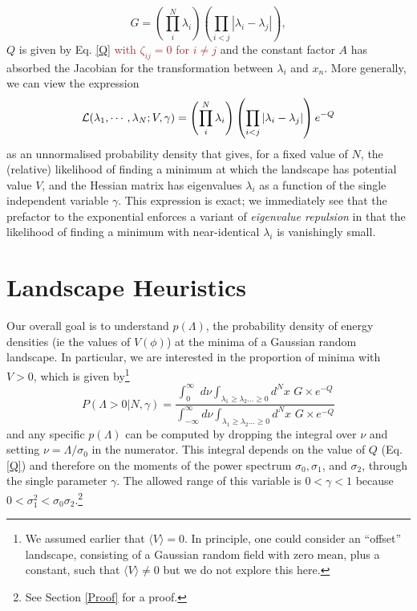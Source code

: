 \documentclass[12pt]{article}
\newcommand{\sh}[1]{\textcolor{brown}{#1}}
\begin{document}
\begin{equation}
G = \left(\prod_{i}^{N} \lambda_i \right)\left(\prod_{i<j} |\lambda_i-\lambda_j|\right),
\end{equation} 
%
$Q$ is given by Eq. \ref{Q} \sh{with $\zeta_{ij}=0$ for $i\neq j$} and the constant factor $A$ has absorbed the Jacobian for the transformation between $\lambda_i$ and $x_n$. More generally, we can view the expression
%
\begin{equation}
{\cal L}(\lambda_1,\cdots, \lambda_N; V, \gamma) = \left(\prod_{i}^{N} \lambda_i \right)\left(\prod_{i<j} |\lambda_i-\lambda_j|\right) e^{-Q}
\end{equation} 
%
as an unnormalised probability density that gives, for a fixed value of $N$, the (relative) likelihood of finding a minimum at which the landscape has potential value $V$, and the Hessian matrix has eigenvalues $\lambda_i$ as a function of the single independent variable $\gamma$. This expression is exact;  we immediately see that the prefactor to the exponential enforces a variant of {\em eigenvalue repulsion\/} \cite{Mehta1990}  in that the likelihood of finding a minimum with near-identical $\lambda_i$ is vanishingly small. 



\section{Landscape Heuristics}

Our  overall goal is to understand $p(\Lambda)$, the probability density of energy densities (ie the values of $V(\phi)$) at the minima of a Gaussian random landscape. In particular, we are interested in the proportion of  minima with $V > 0$, which is given by\footnote{We assumed earlier that $\langle V \rangle = 0$. In principle, one could consider an ``offset'' landscape, consisting of a Gaussian random field with zero mean, plus a constant, such that $\langle V \rangle \neq 0$ but we do not explore this here.}
\begin{equation} \label{PminIntegral}
  P(\Lambda >0| N,\gamma) =  \frac{\int^\infty_0 \,\,d\nu \int_{\lambda_1 \geq \lambda_2 \ldots \geq 0} d^Nx \,\, G \times e^{-Q} }{\int^\infty_{-\infty} d\nu \int_{\lambda_1 \geq \lambda_2 \ldots \geq 0} d^Nx\,\,G \times e^{-Q}}
  \end{equation}
 and any specific $p(\Lambda)$ can be computed by dropping the integral over $\nu$ and setting $\nu=\Lambda/\sigma_0$ in the numerator.  
%
This integral depends on the value of $Q$ (Eq. \ref{Q}) and therefore on the moments of the power spectrum $\sigma_0, \sigma_1$,  and $\sigma_2$, through the single parameter $\gamma$. The allowed range of this variable is $0<\gamma<1$ because $0<\sigma_1^2<\sigma_0\sigma_2$.\footnote{See Section \ref{Proof} for a proof.}
\end{document}
